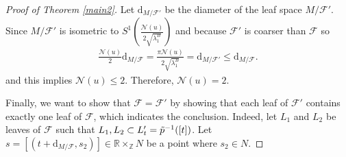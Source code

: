 \documentclass[11pt]{amsart}
\def\d{\mathrm{d}}
\begin{document}
\begin{proof}[Proof of Theorem \ref{main2}]

Let $\d_{M/\mathcal{F'}}$ be the diameter of the leaf space $M/\mathcal{F'}$. Since $M/\mathcal{F'}$ is isometric to $S^1\left(\frac{\mathcal{N}(u)}{2\sqrt{\lambda_1^B}}\right)$ and because $\mathcal{F'}$ is coarser than $\mathcal{F}$ so 
\begin{align*}
\frac{\mathcal{N}(u)}{2}\d_{M/\mathcal{F}}=\frac{\pi\mathcal{N}(u)}{2\sqrt{\lambda_1^B}}=\d_{M/\mathcal{F'}}\leq \d_{M/\mathcal{F}}.
\end{align*}and this implies $\mathcal{N}(u)\leq 2$. Therefore, $\mathcal{N}(u)=2$.


Finally, we want to show that $\mathcal{F}=\mathcal{F}'$ by showing that each leaf of $\mathcal{F}'$ contains exactly one leaf of $\mathcal{F}$, which indicates the conclusion. Indeed, let $L_1$ and $L_2$ be leaves of $\mathcal{F}$ such that $L_1,L_2\subset L'_t= \Tilde{p}^{-1}([t])$. Let $s=[(t+\d_{M/\mathcal{F}},s_2)]\in \mathbb{R}\times_\mathbb{Z} N$ be a point where $s_2\in N$.


\end{proof}
\end{document}
